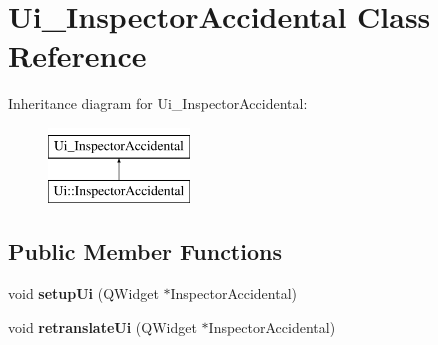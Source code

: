 \hypertarget{class_ui___inspector_accidental}{}\section{Ui\+\_\+\+Inspector\+Accidental Class Reference}
\label{class_ui___inspector_accidental}
Inheritance diagram for Ui\+\_\+\+Inspector\+Accidental\+:\begin{figure}[H]
\begin{center}
\leavevmode
\includegraphics[height=2.000000cm]{class_ui___inspector_accidental}
\end{center}
\end{figure}
\subsection*{Public Member Functions}
\begin{DoxyCompactItemize}
\item 
\mbox{\label{class_ui___inspector_accidental_a54dab8c668dccbcd5c9d415f82269549}} 
void {\bfseries setup\+Ui} (Q\+Widget $\ast$Inspector\+Accidental)
\item 
\mbox{\label{class_ui___inspector_accidental_a46f0dad95ff145e2ddfd925c01bb4e30}} 
void {\bfseries retranslate\+Ui} (Q\+Widget $\ast$Inspector\+Accidental)
\end{DoxyCompactItemize}
